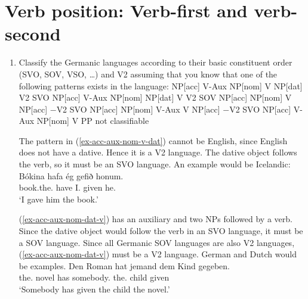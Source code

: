 \section{Verb position: Verb-first and verb-second}



\begin{enumerate}
\item Classify the Germanic languages according to their basic constituent order (SVO, SOV, VSO,
  \ldots) and V2 assuming that you know that one of the following patterns exists in the language:
\eal
\label{ex-v2-task-solution}
\ex 
\label{ex-acc-aux-nom-v-dat}
NP[acc] V-Aux NP[nom] V NP[dat]   \hfill  V2 SVO 
\ex
\label{ex-acc-aux-nom-dat-v} 
NP[acc] V-Aux NP[nom] NP[dat] V   \hfill  V2 SOV
\ex 
\label{ex-acc-nom-v-acc}
NP[acc] NP[nom] V NP[acc]         \hfill $-$V2 SVO
\ex 
\label{ex-acc-nom-aux-v-acc}
NP[acc] NP[nom] V-Aux V NP[acc]   \hfill $-$V2 SVO
\ex 
\label{ex-acc-aux-nom-v-pp}
NP[acc] V-Aux NP[nom] V PP        \hfill not classifiable
\zl

The pattern in (\ref{ex-acc-aux-nom-v-dat}) cannot be English, since English does not have a dative. Hence it is a V2
language. The dative object follows the verb, so it must be an SVO language. An example would be Icelandic:
\ea
\gll Bókina          hafa ég       gefið honum.\\
     book.the.\ACC{} have I.\NOM{} given he.\DAT\\\icelandic
\glt `I gave him the book.'
\z

(\ref{ex-acc-aux-nom-dat-v}) has an auxiliary and two NPs followed by a verb. Since the dative object would follow the verb
in an SVO language, it must be a SOV language. Since all Germanic SOV languages are also V2
languages, (\ref{ex-acc-aux-nom-dat-v}) must be a V2 language. German and Dutch would be examples.
\ea
\gll Den Roman hat jemand dem Kind gegeben.\\
     the.\ACC{} novel has somebody.\NOM{} the.\DAT{} child given\\
\glt `Somebody has given the child the novel.'
\z


\end{enumerate}

